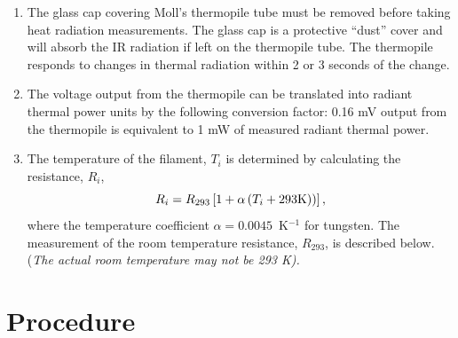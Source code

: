 \begin{enumerate}
\item The glass cap covering Moll's thermopile tube must
be removed before taking heat radiation measurements. The glass cap is
a protective ``dust'' cover and will
absorb the IR radiation if left on the thermopile tube. The thermopile
responds to changes in thermal radiation within 2 or 3 seconds of the
change.


\item The voltage output from the thermopile can be translated into radiant
thermal power units by the following conversion factor: 0.16 mV output
from the thermopile is equivalent to 1 mW of measured radiant thermal
power.

\item The temperature of the filament, $T_i$ is determined by calculating the resistance, $R_i$,
\begin{equation}
R_i = R_{293} \left[ 1 + \alpha \left(T_i + 293 {\rm K} )\right)\right],
\label{eq-filamenttemp}
\end{equation}
where the temperature coefficient $\alpha = 0.0045$~K$^{-1}$ for tungsten.  The measurement of the room temperature resistance, $R_{293}$, is described below. (\em The actual room temperature may not be 293 K).   

\end{enumerate}

\section{Procedure }

